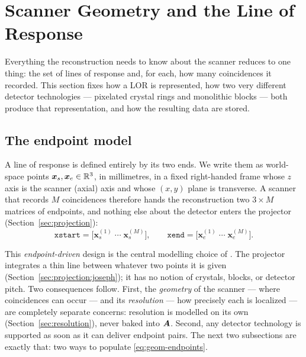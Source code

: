 \section{Scanner Geometry and the Line of Response}
\label{sec:geometry}

Everything the reconstruction needs to know about the scanner reduces to one
thing: the set of lines of response and, for each, how many coincidences it
recorded. This section fixes how a LOR is represented, how two very different
detector technologies --- pixelated crystal rings and monolithic blocks ---
both produce that representation, and how the resulting data are stored.

\subsection{The endpoint model}
\label{sec:geometry:endpoint}

A line of response is defined entirely by its two ends. We write them as
world-space points $\bm{x}_s,\bm{x}_e\in\mathbb{R}^3$, in millimetres, in a fixed
right-handed frame whose $z$ axis is the scanner (axial) axis and whose
$(x,y)$ plane is transverse. A scanner that records $M$ coincidences therefore
hands the reconstruction two $3\times M$ matrices of endpoints, and nothing
else about the detector enters the projector
(Section~\ref{sec:projection}):
\begin{equation}
  \texttt{xstart} = \bigl[\bm{x}_s^{(1)}\;\cdots\;\bm{x}_s^{(M)}\bigr],
  \qquad
  \texttt{xend} = \bigl[\bm{x}_e^{(1)}\;\cdots\;\bm{x}_e^{(M)}\bigr].
  \label{eq:geom-endpoints}
\end{equation}

This \emph{endpoint-driven} design is the central modelling choice of
. The projector integrates a thin line between whatever two
points it is given (Section~\ref{sec:projection:joseph}); it has no notion of
crystals, blocks, or detector pitch. Two consequences follow. First, the
\emph{geometry} of the scanner --- where coincidences can occur --- and its
\emph{resolution} --- how precisely each is localized --- are completely
separate concerns: resolution is modelled on its own
(Section~\ref{sec:resolution}), never baked into $\bm{A}$. Second, any detector
technology is supported as soon as it can deliver endpoint pairs. The next two
subsections are exactly that: two ways to populate
\eqref{eq:geom-endpoints}.

